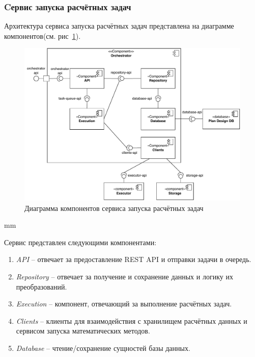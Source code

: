 \subsubsection{\large{Cервис запуска расчётных задач}}

Архитектура сервиса запуска расчётных задач представлена на диаграмме
компонентов(см. рис\ \ref{pic:architecture__orchestrator-component}).

\begin{figure}[H]
	\includegraphics[width=\textwidth]{architecture/pictures/orchestrator/component_common}
	\caption{Диаграмма компонентов сервиса запуска расчётных задач}
	\label{pic:architecture__orchestrator-component}
\end{figure}
 mm

Сервис представлен следующими компонентами:
\begin{enumerate}
	\item {
		\textit{API} -- отвечает за предоставление REST API и отправки задачи в очередь.
	}
	\item {
		\textit{Repository} -- отвечает за получение и сохранение данных и логику их преобразований.
	}
	\item {
		\textit{Execution} -- компонент, отвечающий за выполнение расчётных задач.
	}
	\item {
		\textit{Clients} -- клиенты для взаимодействия с хранилищем расчётных данных
		и сервисом запуска математических методов.
	}
	\item {
		\textit{Database} -- чтение/сохранение сущностей базы данных.
	}
\end{enumerate}

